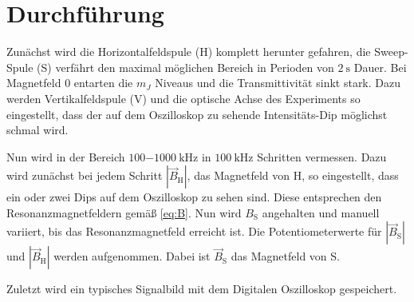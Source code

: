 

\section{Durchführung}
\label{sub:durchfuehrung}

	Zunächst wird die Horizontalfeldspule (H) komplett herunter
		gefahren, die Sweep-Spule (S) verfährt den maximal möglichen
		Bereich in Perioden von $\SI{2}{\second}$ Dauer. Bei Magnetfeld
		$0$
		entarten die $m_J$ Niveaus und
		die Transmittivität sinkt stark. Dazu werden Vertikalfeldspule (V)
		und die optische Achse des Experiments so eingestellt, dass
		der auf dem Oszilloskop zu sehende Intensitäts-Dip möglichst
		schmal wird. %
		\Smiley


	Nun wird in der Bereich $\SI{100-1000}{\kilo\hertz}$ in
		$\SI{100}{\kilo\hertz}$ Schritten vermessen. Dazu wird zunächst
		bei jedem Schritt $|\vec{B}_\text{H}|$, das Magnetfeld von H, so
		 eingestellt, dass ein oder zwei Dips
		auf dem Oszilloskop zu sehen sind. Diese entsprechen den
		Resonanzmagnetfeldern gemäß \eqref{eq:B}.
		Nun wird $B_\text{S}$ angehalten und manuell variiert, bis das
		Resonanzmagnetfeld
		erreicht ist. Die Potentiometerwerte für $|\vec{B}_\text{S}|$ und
		$|\vec{B}_\text{H}|$ werden aufgenommen. Dabei ist
		$\vec{B}_\text{S}$ das Magnetfeld von S.

	 Zuletzt wird ein typisches Signalbild mit dem
		Digitalen Oszilloskop gespeichert.

